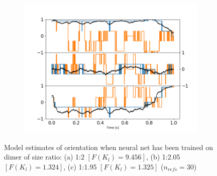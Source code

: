 \begin{figure}[h!]
\begin{subfigure}{0.31\textwidth}
	\end{subfigure}
	\begin{subfigure}{0.31\textwidth}
		\subcaption{}
		\includegraphics[width=\textwidth]{fig8c.png}
	\end{subfigure}
	\caption{Model estimates of orientation when neural net has been trained on dimer of size ratio: (a) 1:2 $[F(K_l)=9.456]$, (b) 1:2.05 $[F(K_l)=1.324]$, (c) 1:1.95 $[F(K_l)=1.325]$ ($n_{refs} = 30$)}
	\label{fig:size}
\end{figure}

